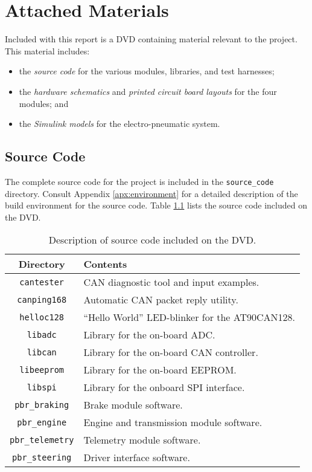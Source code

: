 \chapter{Attached Materials}

Included with this report is a DVD containing material relevant to the project. This material includes:

\begin{itemize}
	\item the \emph{source code} for the various modules, libraries, and test harnesses; 
	\item the \emph{hardware schematics} and \emph{printed circuit board layouts} for the four modules; and
	\item the \emph{Simulink models} for the electro-pneumatic system.
\end{itemize}

\section*{Source Code}

The complete source code for the project is included in the \texttt{source\_code} directory. Consult Appendix \ref{apx:environment} for a detailed description of the build environment for the source code. Table \ref{tbl:attached_source_code} lists the source code included on the DVD.

\begin{table}[H]
\caption{Description of source code included on the DVD.}
\centering
\begin{tabular}{|c|l|}
	\hline 
	Directory & Contents \\ 
	\hline
	\hline
	\texttt{cantester} & CAN diagnostic tool and input examples. \\
	\hline	
	\texttt{canping168} & {}Automatic CAN packet reply utility. \\
	\hline	
	\texttt{helloc128} & {}``Hello World'' LED-blinker for the AT90CAN128. \\ 
	\hline		
	\texttt{libadc} & Library for the on-board ADC. \\ 
	\hline		
	\texttt{libcan} & Library for the on-board CAN controller. \\ 
	\hline
	\texttt{libeeprom} & Library for the on-board EEPROM. \\ 
	\hline		
	\texttt{libspi} & Library for the onboard SPI interface. \\ 
	\hline	
	\texttt{pbr\_braking} & Brake module software. \\ 
	\hline
	\texttt{pbr\_engine} & Engine and transmission module software. \\ 
	\hline	
	\texttt{pbr\_telemetry} & Telemetry module software. \\ 
	\hline	
	\texttt{pbr\_steering} & Driver interface software. \\ 
	\hline	
\end{tabular}
\label{tbl:attached_source_code}
\end{table}

